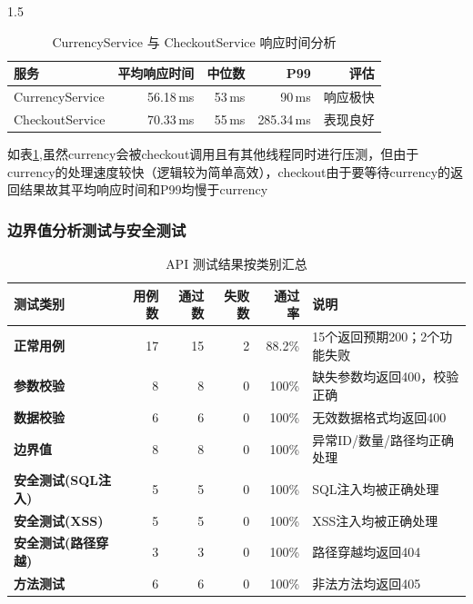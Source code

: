 \documentclass[a4paper,12pt]{report}
\begin{document}
\begin{spacing}{1.5}
\begin{table}[htbp]
	\centering
	\caption{CurrencyService 与 CheckoutService 响应时间分析}
	\label{tab:currency_checkout_perf}
	\begin{tabular}{lrrrr}
		\toprule
		\textbf{服务} & \textbf{平均响应时间} & \textbf{中位数} & \textbf{P99} & \textbf{评估} \\
		\midrule
		CurrencyService & 56.18\,ms & 53\,ms & 90\,ms & 响应极快 \\
		CheckoutService & 70.33\,ms & 55\,ms & 285.34\,ms & 表现良好 \\
		\bottomrule
	\end{tabular}
\end{table}

如表\ref{tab:currency_checkout_perf},虽然currency会被checkout调用且有其他线程同时进行压测，但由于currency的处理速度较快（逻辑较为简单高效），checkout由于要等待currency的返回结果故其平均响应时间和P99均慢于currency

\subsubsection{边界值分析测试与安全测试}

\begin{table}[htbp]
	\centering
	\caption{API 测试结果按类别汇总}
	\label{tab:api_test_summary}
	\begin{tabular}{lrrrrl}
		\toprule
		\textbf{测试类别} & \textbf{用例数} & \textbf{通过数} & \textbf{失败数} & \textbf{通过率} & \textbf{说明} \\
		\midrule
		\textbf{正常用例} & 17 & 15 & 2 & 88.2\% & 15个返回预期200；2个功能失败\\
		\textbf{参数校验} & 8 & 8 & 0 & 100\% & 缺失参数均返回400，校验正确 \\
		\textbf{数据校验} & 6 & 6 & 0 & 100\% & 无效数据格式均返回400 \\
		\textbf{边界值} & 8 & 8 & 0 & 100\% & 异常ID/数量/路径均正确处理 \\
		\textbf{安全测试(SQL注入)} & 5 & 5 & 0 & 100\% & SQL注入均被正确处理 \\
		\textbf{安全测试(XSS)} & 5 & 5 & 0 & 100\% & XSS注入均被正确处理 \\
		\textbf{安全测试(路径穿越)} & 3 & 3 & 0 & 100\% & 路径穿越均返回404 \\
		\textbf{方法测试} & 6 & 6 & 0 & 100\% & 非法方法均返回405 \\
		\bottomrule
	\end{tabular}
\end{table}


\end{spacing}
\end{document}
